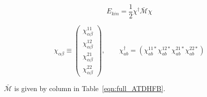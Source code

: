 \begin{equation}\label{eqn:kinetic_energy}
E_{kin} = \frac{1}{2}\chi^\dagger\mathcal{\bar{M}}\chi
\end{equation}


\begin{equation}
\chi_{\alpha\beta} \equiv \left(\begin{array}{c}
\chi_{\alpha\beta}^{11}\\
\chi_{\alpha\beta}^{12}\\
\chi_{\alpha\beta}^{21}\\
\chi_{\alpha\beta}^{22}
\end{array}\right), \qquad
\chi^\dagger_{ab} = \left(
\chi_{ab}^{11*} 
\chi_{ab}^{12*} 
\chi_{ab}^{21*} 
\chi_{ab}^{22*} 
\right)
\end{equation}

$\mathcal{\bar{M}}$ is given by column in Table~\eqref{eqn:full_ATDHFB}.

